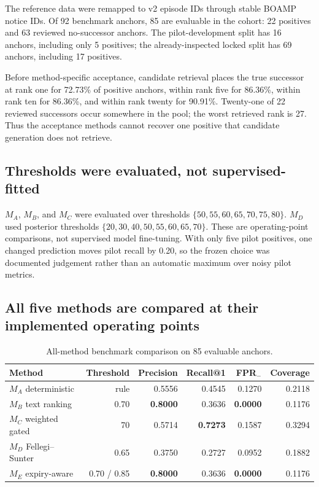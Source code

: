 \documentclass[11pt,a4paper]{article}
\begin{document}
The reference data were remapped to v2 episode IDs through stable BOAMP notice IDs.
Of 92 benchmark anchors, 85 are evaluable in the cohort: 22 positives and 63 reviewed
no-successor anchors. The pilot-development split has 16 anchors, including only 5
positives; the already-inspected locked split has 69 anchors, including 17 positives.

Before method-specific acceptance, candidate retrieval places the true successor at
rank one for 72.73\% of positive anchors, within rank five for 86.36\%, within rank
ten for 86.36\%, and within rank twenty for 90.91\%. Twenty-one of 22 reviewed
successors occur somewhere in the pool; the worst retrieved rank is 27. Thus the
acceptance methods cannot recover one positive that candidate generation does not
retrieve.

\subsection{Thresholds were evaluated, not supervised-fitted}

$M_A$, $M_B$, and $M_C$ were evaluated over thresholds
$\{50,55,60,65,70,75,80\}$. $M_D$ used posterior thresholds
$\{20,30,40,50,55,60,65,70\}$. These are operating-point comparisons, not
supervised model fine-tuning. With only five pilot positives, one changed prediction
moves pilot recall by 0.20, so the frozen choice was documented judgement rather than
an automatic maximum over noisy pilot metrics.

\subsection{All five methods are compared at their implemented operating points}

\begin{table}[H]
\centering
\caption{All-method benchmark comparison on 85 evaluable anchors.}
\label{tab:allmethods}
\small
\begin{tabular}{lrrrrr}
\toprule
\textbf{Method} & \textbf{Threshold} & \textbf{Precision} & \textbf{Recall@1} &
\textbf{FPR$_-$} & \textbf{Coverage} \\
\midrule
$M_A$ deterministic & rule & 0.5556 & 0.4545 & 0.1270 & 0.2118 \\
$M_B$ text ranking & 0.70 & \textbf{0.8000} & 0.3636 & \textbf{0.0000} & 0.1176 \\
$M_C$ weighted gated & 70 & 0.5714 & \textbf{0.7273} & 0.1587 & 0.3294 \\
$M_D$ Fellegi--Sunter & 0.65 & 0.3750 & 0.2727 & 0.0952 & 0.1882 \\
$M_E$ expiry-aware & 0.70 / 0.85 & \textbf{0.8000} & 0.3636 & \textbf{0.0000} & 0.1176 \\
\bottomrule
\end{tabular}
\end{table}
\end{document}
